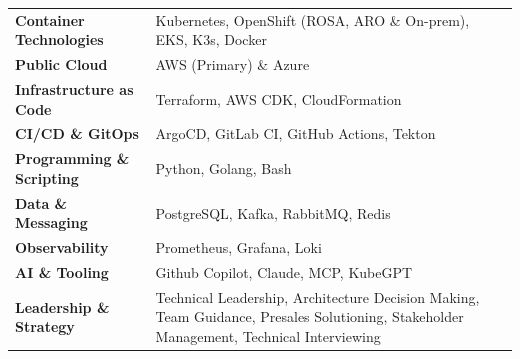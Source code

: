 
\begin{tabularx}{\textwidth}{@{}l X@{}}
\textbf{Container Technologies} & Kubernetes, OpenShift (ROSA, ARO \& On-prem), EKS, K3s, Docker \\[0.05cm]
\textbf{Public Cloud} & AWS (Primary) \& Azure \\[0.05cm]
\textbf{Infrastructure as Code} & Terraform, AWS CDK, CloudFormation \\[0.05cm]
\textbf{CI/CD \& GitOps} & ArgoCD, GitLab CI, GitHub Actions, Tekton \\[0.05cm]
\textbf{Programming \& Scripting} & Python, Golang, Bash \\[0.05cm]
\textbf{Data \& Messaging} & PostgreSQL, Kafka, RabbitMQ, Redis \\[0.05cm]
\textbf{Observability} & Prometheus, Grafana, Loki \\[0.05cm]
\textbf{AI \& Tooling} & Github Copilot, Claude, MCP, KubeGPT \\[0.05cm]
\textbf{Leadership \& Strategy} & Technical Leadership, Architecture Decision Making, Team Guidance, Presales Solutioning, Stakeholder Management, Technical Interviewing \\
\end{tabularx}

\vspace{0.05cm}
